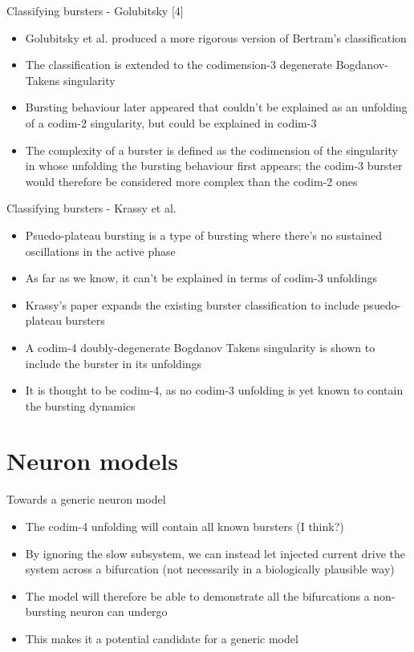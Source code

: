 \documentclass{beamer}
\begin{document}
\begin{frame}[label={sec:org6e7828b}]{Classifying bursters - Golubitsky [4]}
\begin{itemize}
\item Golubitsky et al. produced a more rigorous version of Bertram's classification
\item The classification is extended to the codimension-3 degenerate Bogdanov-Takens singularity
\item Bursting behaviour later appeared that couldn't be explained as an unfolding of a codim-2 singularity, but could be explained in codim-3
\item The complexity of a burster is defined as the codimension of the singularity in whose unfolding the bursting behaviour first appears; the codim-3 burster would therefore be considered more complex than the codim-2 ones
\end{itemize}
\end{frame}

\begin{frame}[label={sec:orged8f425}]{Classifying bursters - Krassy et al.}
\begin{itemize}
\item Psuedo-plateau bursting is a type of bursting where there's no sustained oscillations in the active phase
\item As far as we know, it can't be explained in terms of codim-3 unfoldings
\item Krassy's paper expands the existing burster classification to include psuedo-plateau bursters
\item A codim-4 doubly-degenerate Bogdanov Takens singularity is shown to include the burster in its unfoldings
\item It is thought to be codim-4, as no codim-3 unfolding is yet known to contain the bursting dynamics
\end{itemize}
\end{frame}


\section{Neuron models}
\label{sec:orgc9fc806}
\begin{frame}[label={sec:org7d75343}]{Towards a generic neuron model}
\begin{itemize}
\item The codim-4 unfolding will contain all known bursters (I think?)
\item By ignoring the slow subsystem, we can instead let injected current drive the system across a bifurcation (not necessarily in a biologically plausible way)
\item The model will therefore be able to demonstrate all the bifurcations a non-bursting neuron can undergo
\item This makes it a potential candidate for a generic model
\end{itemize}
\end{frame}
\end{document}
